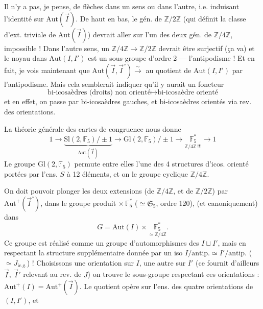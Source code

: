 \documentclass[11pt,a4paper]{article}
\begin{document}
Il n'y a pas, je pense, de flèches dans un sens ou dans l'autre, i.e. induisant l'identité sur $\mathrm{Aut}(\vec I)$. De haut en bas, le gén. de $\mathbb Z/2\mathbb Z$ (qui définit la classe d'ext. triviale de $\mathrm{Aut}(\vec I)$) devrait aller sur l'un des deux gén. de $\mathbb Z/4\mathbb Z$, impossible ! Dans l'autre sens, un \struck{\ill{}} $\mathbb Z/4\mathbb Z\to\mathbb Z/2\mathbb Z$ devrait être surjectif (ça va) et le noyau  dans $\mathrm{Aut}(I,I')$ est un sous-groupe d'ordre 2 — l'antipodisme ! Et en fait, je vois maintenant que $\mathrm{Aut}(\vec I,\vec I^\circ) \xrightarrow{\sim}$  au quotient de $\mathrm{Aut}(I,I')$ par l'antipodisme. Mais cela semblerait indiquer qu'il y aurait un foncteur
\[
\text{bi-icosaèdres (droits) non orienté} \longmapsto \text{bi-icosaèdre orienté}
\]
et en effet, on passe par bi-icosaèdres gauches, et bi-icosaèdres orientés via rev. des orientations.

La théorie générale des cartes de congruence nous donne
\[
1 \longrightarrow \underbrace{\mathrm{Sl}(2,\mathbb F_5)/\pm1}_{\mathrm{Aut}(\vec I)} \longrightarrow \mathrm{Gl}(2,\mathbb F_5)/\pm1 \longrightarrow \underset{\textstyle\mathbb Z/4\mathbb Z\ !!!}{\mathbb F_5^*} \longrightarrow 1
\]
Le groupe $\mathrm{Gl}(2,\mathbb F_5)$ permute entre elles l'une des 4 structures d'icos. orienté portées par l'ens. $S$ à 12 éléments, et on  le groupe cyclique $\mathbb Z/4\mathbb Z$.

On doit pouvoir plonger les deux extensions (de $\mathbb Z/4\mathbb Z$, et de $\mathbb Z/2\mathbb Z$) par $\mathrm{Aut}^+(\vec I^\circ)$, dans le groupe produit \struck{\ill{}}  $\times\,\mathbb F_5^*$ ($\simeq\mathfrak S_5$, ordre 120),  (et canoniquement) dans
\[
G = \mathrm{Aut}(I)\times\underset{\textstyle\simeq\mathbb Z/4\mathbb Z}{\mathbb F_5^*} .
\]
Ce groupe est réalisé comme un groupe d'automorphismes des    $I\sqcup I'$, mais en respectant la structure supplémentaire donnée par un iso $I/\text{antip.}\simeq I'/\text{antip.}$ ($\simeq J_{\text{ic.g.}}$) ! Choisissons une orientation sur $I$, une autre sur $I'$ (ce  fournit d'ailleurs $\vec I$, $\vec I'$ relevant  au rev.   de $J$) on trouve le sous-groupe respectant ces orientations : $\mathrm{Aut}^+(I) = \mathrm{Aut}^+(\vec I)$. Le quotient  opère sur l'ens. des quatre orientations de $(I,I')$, et 
\end{document}
